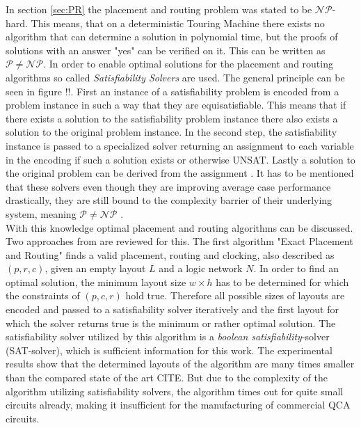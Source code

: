 In section \ref{sec:PR} the placement and routing problem was stated to be $\mathcal{NP}$-hard. This means, that on a deterministic Touring Machine there exists no algorithm that can determine a solution in polynomial time, but the proofs of solutions with an answer "yes" can be verified on it. This can be written as $\mathcal{P} \neq \mathcal{NP}$. In order to enable optimal solutions for the placement and routing algorithms so called \textit{Satisfiability Solvers} are used. The general principle can be seen in figure !!. First an instance of a satisfiability problem is encoded from a problem instance in such a way that they are equisatisfiable. This means that if there exists a solution to the satisfiability problem instance there also exists a solution to the original problem instance. In the second step, the satisfiability instance is passed to a specialized solver
returning an assignment to each variable in the encoding if such a solution exists or otherwise UNSAT. Lastly a solution to the original problem can be derived from the assignment \cite{Walter}. It has to be mentioned that these solvers even though they are improving average case performance drastically, they are still bound to the complexity barrier of their underlying system, meaning  $\mathcal{P} \neq \mathcal{NP}$ \cite{NP-P}.\\
With this knowledge optimal placement and routing algorithms can be discussed. Two approaches from \cite{Walter} are reviewed for this. The first algorithm "Exact Placement and Routing" finds a valid placement, routing and clocking, also described as $(p, r, c)$, given an empty layout $L$ and a logic network $N$. In order to find an optimal solution, the minimum layout size $w \times h$
has to be determined for which the constraints of $(p, c, r)$ hold true. Therefore all possible sizes of layouts are encoded and passed to a satisfiability solver iteratively and the first layout for which the solver returns true is the minimum or rather optimal solution. The satisfiability solver utilized by this algorithm is a \textit{boolean satisfiability}-solver (SAT-solver), which is sufficient information for this work. The experimental results show that the determined layouts of the algorithm are many times smaller than the compared state of the art CITE. But due to the complexity of the algorithm utilizing satisfiability solvers, the algorithm times out for quite small circuits already, making it insufficient for the manufacturing of commercial QCA circuits.\\

